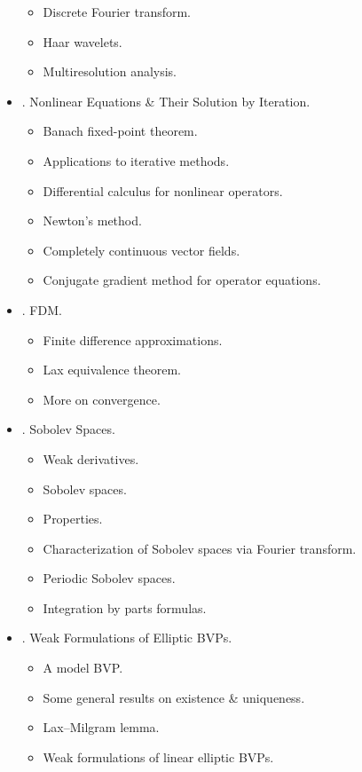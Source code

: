 \documentclass{article}
\begin{document}
\begin{itemize}
\begin{itemize}
		\item {\sf Discrete Fourier transform.}
		\item {\sf Haar wavelets.}
		\item {\sf Multiresolution analysis.}
	\end{itemize}
	\item {. Nonlinear Equations \& Their Solution by Iteration.}
	\begin{itemize}
		\item {\sf Banach fixed-point theorem.}
		\item {\sf Applications to iterative methods.}
		\item {\sf Differential calculus for nonlinear operators.}
		\item {\sf Newton's method.}
		\item {\sf Completely continuous vector fields.}
		\item {\sf Conjugate gradient method for operator equations.}
	\end{itemize}
	\item {. FDM.}
	\begin{itemize}
		\item {\sf Finite difference approximations.}
		\item {\sf Lax equivalence theorem.}
		\item {\sf More on convergence.}
	\end{itemize}
	\item {. Sobolev Spaces.}
	\begin{itemize}
		\item {\sf Weak derivatives.}
		\item {\sf Sobolev spaces.}
		\item {\sf Properties.}
		\item {\sf Characterization of Sobolev spaces via Fourier transform.}
		\item {\sf Periodic Sobolev spaces.}
		\item {\sf Integration by parts formulas.}
	\end{itemize}
	\item {. Weak Formulations of Elliptic BVPs.}
	\begin{itemize}
		\item {\sf A model BVP.}
		\item {\sf Some general results on existence \& uniqueness.}
		\item {\sf Lax--Milgram lemma.}
		\item {\sf Weak formulations of linear elliptic BVPs.}

\end{itemize}
\end{itemize}
\end{document}
